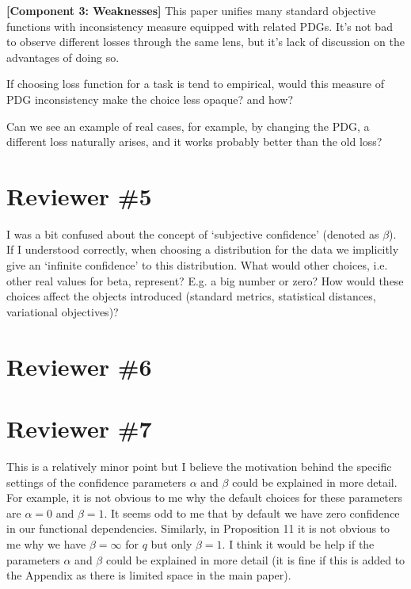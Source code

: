 \begin{reviewer says}
    \textbf{[Component 3: Weaknesses]} This paper unifies many standard objective functions with inconsistency measure equipped with related PDGs. It's not bad to observe different losses through the same lens, but it's lack of discussion on the advantages of doing so.
\end{reviewer says}

\begin{reviewer says}
    If choosing loss function for a task is tend to empirical, would this measure of PDG inconsistency make the choice less opaque? and how?
\end{reviewer says}

\begin{reviewer says}
    Can we see an example of real cases, for example, by changing the PDG, a different loss naturally arises, and it works probably better than the old loss?
\end{reviewer says}
\section*{Reviewer \#5}

\begin{reviewer says}
 I was a bit confused about the concept of ‘subjective confidence’ (denoted as $\beta$). If I understood correctly, when choosing a distribution for the data we implicitly give an ‘infinite confidence’ to this distribution. What would other choices, i.e. other real values for beta, represent? E.g. a big number or zero? How would these choices affect the objects introduced (standard metrics, statistical distances, variational objectives)?
\end{reviewer says}

\section*{Reviewer \#6}
\section*{Reviewer \#7}

\begin{reviewer says}
    This is a relatively minor point but I believe the motivation behind the specific settings of the confidence parameters $\alpha$ and $\beta$ could be explained in more detail. For example, it is not obvious to me why the default choices for these parameters are $\alpha = 0$ and $\beta = 1$. It seems odd to me that by default we have zero confidence in our functional dependencies. Similarly, in Proposition 11 it is not obvious to me why we have $\beta = \infty$ for $q$ but only $\beta = 1$. I think it would be help if the parameters $\alpha$ and $\beta$ could be explained in more detail (it is fine if this is added to the Appendix as there is limited space in the main paper).
\end{reviewer says}

